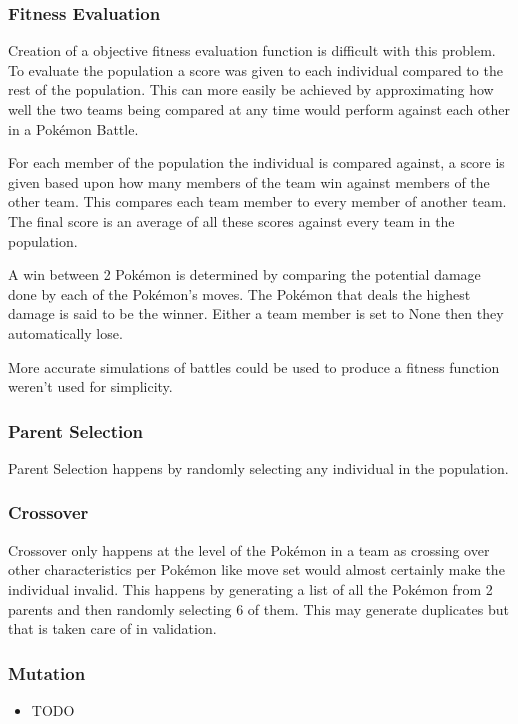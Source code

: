 \documentclass[a4paper]{article}
\newcommand{\Pokemon}{Pok\'{e}mon}
\begin{document}
\subsubsection{Fitness Evaluation}
\par
Creation of a objective fitness evaluation function is difficult with this problem.
To evaluate the population a score was given to each individual compared to the rest of the population.
This can more easily be achieved by approximating how well the two teams being compared at any time would perform against each other in a \Pokemon{} Battle.
\par
For each member of the population the individual is compared against, a score is given based upon how many members of the team win against members of the other team.
This compares each team member to every member of another team.
The final score is an average of all these scores against every team in the population.
\par
A win between 2 \Pokemon{} is determined by comparing the potential damage done by each of the \Pokemon{}'s moves.
The \Pokemon{} that deals the highest damage is said to be the winner.
Either a team member is set to None then they automatically lose.
\par
More accurate simulations of battles could be used to produce a fitness function weren't used for simplicity.
\subsubsection{Parent Selection}
\par
Parent Selection happens by randomly selecting any individual in the population.
\subsubsection{Crossover}
\par
Crossover only happens at the level of the \Pokemon{} in a team as crossing over other characteristics per \Pokemon{} like move set would almost certainly make the individual invalid.
This happens by generating a list of all the \Pokemon{} from 2 parents and then randomly selecting 6 of them.
This may generate duplicates but that is taken care of in validation.
\subsubsection{Mutation}
\par
\begin{itemize}
	\item TODO
\end{itemize}
\end{document}
